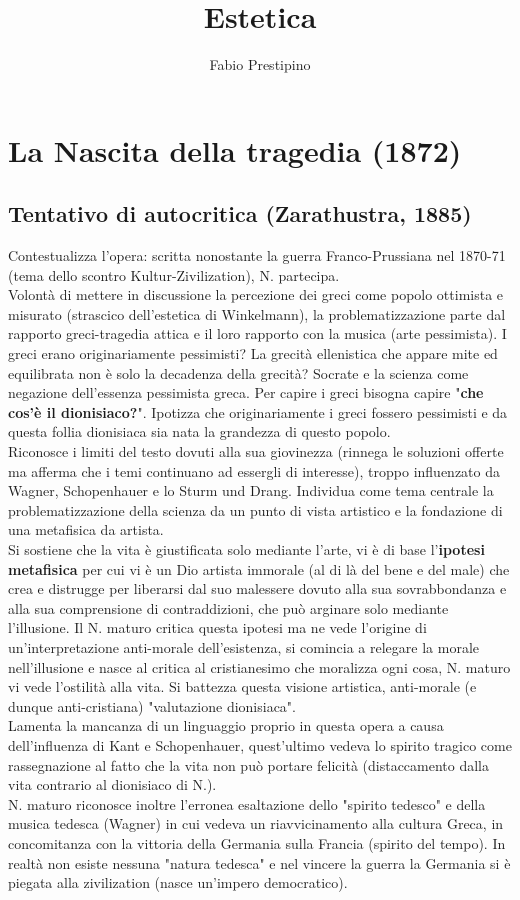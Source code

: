 \documentclass[10pt,a4paper]{article}
\author{Fabio Prestipino}
\title{Estetica}
\begin{document}
	\maketitle
\section{La Nascita della tragedia (1872)}
\subsection{Tentativo di autocritica (Zarathustra, 1885)}
Contestualizza l'opera: scritta nonostante la guerra Franco-Prussiana nel 1870-71 (tema dello scontro Kultur-Zivilization), N. partecipa.\\
Volontà di mettere in discussione la percezione dei greci come popolo ottimista e misurato (strascico dell'estetica di Winkelmann), la problematizzazione parte dal rapporto greci-tragedia attica e il loro rapporto con la musica (arte pessimista). I greci erano originariamente pessimisti? La grecità ellenistica che appare mite ed equilibrata non è solo la decadenza della grecità? Socrate e la scienza come negazione dell'essenza pessimista greca. Per capire i greci bisogna capire "\textbf{che cos'è il dionisiaco?}". Ipotizza che originariamente i greci fossero pessimisti e da questa follia dionisiaca sia nata la grandezza di questo popolo.\\
Riconosce i limiti del testo dovuti alla sua giovinezza (rinnega le soluzioni offerte ma afferma che i temi continuano ad essergli di interesse), troppo influenzato da Wagner, Schopenhauer e lo Sturm und Drang. Individua come tema centrale la problematizzazione della scienza da un punto di vista artistico e la fondazione di una metafisica da artista.\\
Si sostiene che la vita è giustificata solo mediante l'arte, vi è di base l'\textbf{ipotesi metafisica} per cui vi è un Dio artista immorale (al di là del bene e del male) che crea e distrugge per liberarsi dal suo malessere dovuto alla sua sovrabbondanza e alla sua comprensione di contraddizioni, che può arginare solo mediante l'illusione. Il N. maturo critica questa ipotesi ma ne vede l'origine di un'interpretazione anti-morale dell'esistenza, si comincia a relegare la morale nell'illusione e nasce al critica al cristianesimo che moralizza ogni cosa, N. maturo vi vede l'ostilità alla vita. Si battezza questa visione artistica, anti-morale (e dunque anti-cristiana) "valutazione dionisiaca".\\
Lamenta la mancanza di un linguaggio proprio in questa opera a causa dell'influenza di Kant e Schopenhauer, quest'ultimo vedeva lo spirito tragico come rassegnazione al fatto che la vita non può portare felicità (distaccamento dalla vita contrario al dionisiaco di N.).\\
N. maturo riconosce inoltre l'erronea esaltazione dello "spirito tedesco" e della musica tedesca (Wagner) in cui vedeva un riavvicinamento alla cultura Greca, in concomitanza con la vittoria della Germania sulla Francia (spirito del tempo). In realtà non esiste nessuna "natura tedesca" e nel vincere la guerra la Germania si è piegata alla zivilization (nasce un'impero democratico). 
\end{document}
